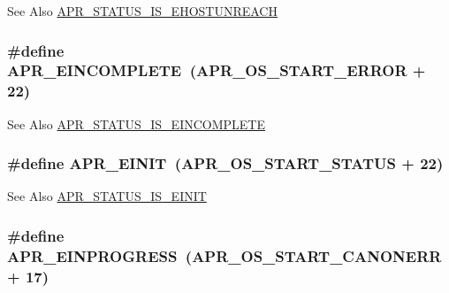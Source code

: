 \begin{DoxySeeAlso}{See Also}
\hyperlink{group___a_p_r___s_t_a_t_u_s___i_s_gad9307ff02e50296c528b79a670dc80bb}{A\-P\-R\-\_\-\-S\-T\-A\-T\-U\-S\-\_\-\-I\-S\-\_\-\-E\-H\-O\-S\-T\-U\-N\-R\-E\-A\-C\-H} 
\end{DoxySeeAlso}
\hypertarget{group___a_p_r___error_gab4357bcbdc2922183e0594865b59ce58}{
\subsubsection[{A\-P\-R\-\_\-\-E\-I\-N\-C\-O\-M\-P\-L\-E\-T\-E}]{\setlength{\rightskip}{0pt plus 5cm}\#define A\-P\-R\-\_\-\-E\-I\-N\-C\-O\-M\-P\-L\-E\-T\-E~({\bf A\-P\-R\-\_\-\-O\-S\-\_\-\-S\-T\-A\-R\-T\-\_\-\-E\-R\-R\-O\-R} + 22)}}\label{group___a_p_r___error_gab4357bcbdc2922183e0594865b59ce58}
\begin{DoxySeeAlso}{See Also}
\hyperlink{group___a_p_r___s_t_a_t_u_s___i_s_gae7354f40a912dc43fe76ba2a59de0403}{A\-P\-R\-\_\-\-S\-T\-A\-T\-U\-S\-\_\-\-I\-S\-\_\-\-E\-I\-N\-C\-O\-M\-P\-L\-E\-T\-E} 
\end{DoxySeeAlso}
\hypertarget{group___a_p_r___error_gaacd087793c97a3493eafc14075775b82}{
\subsubsection[{A\-P\-R\-\_\-\-E\-I\-N\-I\-T}]{\setlength{\rightskip}{0pt plus 5cm}\#define A\-P\-R\-\_\-\-E\-I\-N\-I\-T~({\bf A\-P\-R\-\_\-\-O\-S\-\_\-\-S\-T\-A\-R\-T\-\_\-\-S\-T\-A\-T\-U\-S} + 22)}}\label{group___a_p_r___error_gaacd087793c97a3493eafc14075775b82}
\begin{DoxySeeAlso}{See Also}
\hyperlink{group___a_p_r___s_t_a_t_u_s___i_s_gaeaa5fbb21b72fcbbe98b0f100d204048}{A\-P\-R\-\_\-\-S\-T\-A\-T\-U\-S\-\_\-\-I\-S\-\_\-\-E\-I\-N\-I\-T} 
\end{DoxySeeAlso}
\hypertarget{group___a_p_r___error_ga5c311361f4f68f289c90f3cdfd77eb79}{
\subsubsection[{A\-P\-R\-\_\-\-E\-I\-N\-P\-R\-O\-G\-R\-E\-S\-S}]{\setlength{\rightskip}{0pt plus 5cm}\#define A\-P\-R\-\_\-\-E\-I\-N\-P\-R\-O\-G\-R\-E\-S\-S~({\bf A\-P\-R\-\_\-\-O\-S\-\_\-\-S\-T\-A\-R\-T\-\_\-\-C\-A\-N\-O\-N\-E\-R\-R} + 17)}}\label{group___a_p_r___error_ga5c311361f4f68f289c90f3cdfd77eb79}

